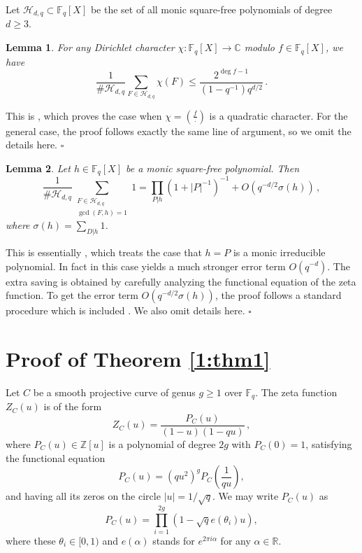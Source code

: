 \documentclass[12pt]{amsart}
\theoremstyle{plain}
\newtheorem{lemma}{Lemma}
\newcommand{\Z}{{\mathbb Z}}
\newcommand{\R}{{\mathbb R}}
\newcommand{\CC}{{\mathbb C}}
\newcommand{\F}{{\mathbb F}_q}
\newcommand{\HH}{{\mathcal H}}
\begin{document}
Let $\HH_{d,q} \subset \F[X]$ be the set of all monic square-free polynomials of degree $d \ge 3$. %

\begin{lemma} \label{2:lem1} For any Dirichlet character $\chi: \F[X] \to \CC$ modulo $f \in \F[X]$, we have
\[\frac{1}{\#\HH_{d,q}} \sum_{F \in \HH_{d,q}} \chi(F) \le \frac{2^{\deg f-1}}{\left(1-q^{-1}\right)q^{d/2}}\,.\]
\end{lemma}
 This is \cite[Lemma 3.1]{fai}, which proves the case when $\chi=\left(\frac{f}{\cdot}\right)$ is a quadratic character. For the general case, the proof follows exactly the same line of argument, so we omit the details here. \quad $\square$

\begin{lemma} \label{2:lem2} Let $h \in \F[X]$ be a monic square-free polynomial. Then
\[\frac{1}{\#\HH_{d,q}} \sum_{\substack{F \in \HH_{d,q}\\ \gcd(F,h)=1}} 1 = \prod_{P|h}\left(1+|P|^{-1}\right)^{-1}+O\left(q^{-d/2} \sigma(h)\right)\,,\]
where $\sigma(h)=\sum_{D|h}1$.
\end{lemma}
 This is essentially \cite[Lemma 5]{rud}, which treats the case that $h=P$ is a monic irreducible polynomial. In fact in this case \cite[Lemma 5]{rud} yields a much stronger error term $O(q^{-d})$. The extra saving is obtained by carefully analyzing the functional equation of the zeta function. To get the error term $O(q^{-d/2}\sigma(h))$, the proof follows a standard procedure which is included \cite[Lemma 5]{rud}. We also omit details here. \quad $\square$


\section{Proof of Theorem \ref{1:thm1}}

Let $C$ be a smooth projective curve of genus $g \ge 1$ over $\F$. The zeta function $Z_C(u)$ is of the form
\[Z_C(u) =\frac{P_C(u)}{(1-u)(1-qu)}\,, \]
where $P_{C}(u) \in \Z[u]$ is a polynomial of degree $2g$ with $P_{C}(0)=1$, satisfying the functional equation
\[P_{C}(u)=\left(qu^2\right)^g P_{C}\left(\frac{1}{qu}\right), \]
and having all its zeros on the circle $|u| = 1/\sqrt{q}$. We may write $P_C(u)$ as
\[P_C(u)= \prod_{i=1}^{2g} \left(1-\sqrt{q}e(\theta_i) u\right),\]
where these $\theta_i \in [0,1)$ and $e(\alpha)$ stands for $e^{2 \pi i \alpha}$ for any $\alpha \in \R$.
\end{document}
